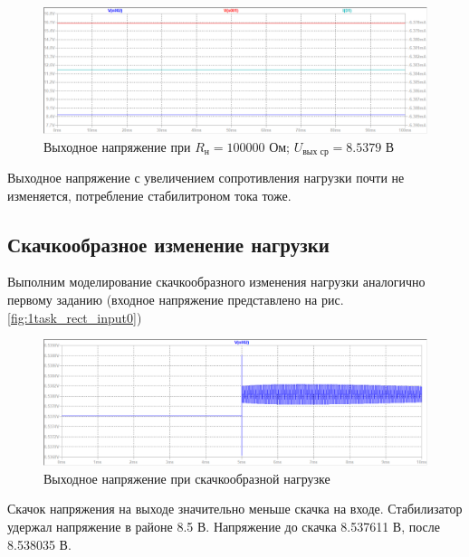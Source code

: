 \documentclass[a4paper, 12pt]{article}
\begin{document}
    \begin{figure}[H]
        \centering
        \includegraphics[scale=0.46]{3task_R100k.png}
        \captionsetup{skip=0pt}
        \caption{Выходное напряжение при $R_{\text{н}}=100000$ Ом; $U_{\text{вых ср}}=8.5379$ В}
        \label{fig:3task_R100k}
    \end{figure}
    \noindent Выходное напряжение с увеличением сопротивления нагрузки почти не изменяется,
    потребление стабилитроном тока тоже.


    \subsection{Скачкообразное изменение нагрузки}
    Выполним моделирование скачкообразного изменения нагрузки аналогично первому заданию
    (входное напряжение представлено на рис. \ref{fig:1task_rect_input0})
    \begin{figure}[H]
        \centering
        \includegraphics[scale=0.46]{3task_rect.png}
        \captionsetup{skip=0pt}
        \caption{Выходное напряжение при скачкообразной нагрузке}
        \label{fig:3task_rect}
    \end{figure}
    \noindent Скачок напряжения на выходе значительно меньше скачка на входе. Стабилизатор
    удержал напряжение в районе 8.5 В. Напряжение до скачка 8.537611 В, после 8.538035 В.
\end{document}
